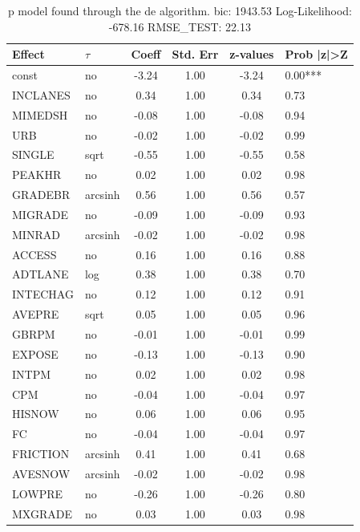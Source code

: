 \begin{table}
	\caption{p model found through the de algorithm. bic: 1943.53 Log-Likelihood: -678.16 RMSE_TEST: 22.13}
	\begin{center}
		\begin{tabular}{|l|l|c|c|c|l|}
			\hline
			Effect & $\tau$ & Coeff & Std. Err & z-values & Prob |z|>Z \\
			\hline
			const & no & -3.24 & 1.00 & -3.24 & 0.00*** \\
			\hline
			INCLANES & no & 0.34 & 1.00 & 0.34 & 0.73 \\
			\hline
			MIMEDSH & no & -0.08 & 1.00 & -0.08 & 0.94 \\
			\hline
			URB & no & -0.02 & 1.00 & -0.02 & 0.99 \\
			\hline
			SINGLE & sqrt & -0.55 & 1.00 & -0.55 & 0.58 \\
			\hline
			PEAKHR & no & 0.02 & 1.00 & 0.02 & 0.98 \\
			\hline
			GRADEBR & arcsinh & 0.56 & 1.00 & 0.56 & 0.57 \\
			\hline
			MIGRADE & no & -0.09 & 1.00 & -0.09 & 0.93 \\
			\hline
			MINRAD & arcsinh & -0.02 & 1.00 & -0.02 & 0.98 \\
			\hline
			ACCESS & no & 0.16 & 1.00 & 0.16 & 0.88 \\
			\hline
			ADTLANE & log & 0.38 & 1.00 & 0.38 & 0.70 \\
			\hline
			INTECHAG & no & 0.12 & 1.00 & 0.12 & 0.91 \\
			\hline
			AVEPRE & sqrt & 0.05 & 1.00 & 0.05 & 0.96 \\
			\hline
			GBRPM & no & -0.01 & 1.00 & -0.01 & 0.99 \\
			\hline
			EXPOSE & no & -0.13 & 1.00 & -0.13 & 0.90 \\
			\hline
			INTPM & no & 0.02 & 1.00 & 0.02 & 0.98 \\
			\hline
			CPM & no & -0.04 & 1.00 & -0.04 & 0.97 \\
			\hline
			HISNOW & no & 0.06 & 1.00 & 0.06 & 0.95 \\
			\hline
			FC & no & -0.04 & 1.00 & -0.04 & 0.97 \\
			\hline
			FRICTION & arcsinh & 0.41 & 1.00 & 0.41 & 0.68 \\
			\hline
			AVESNOW & arcsinh & -0.02 & 1.00 & -0.02 & 0.98 \\
			\hline
			LOWPRE & no & -0.26 & 1.00 & -0.26 & 0.80 \\
			\hline
			MXGRADE & no & 0.03 & 1.00 & 0.03 & 0.98 \\

\end{tabular}
\end{center}
\end{table}
